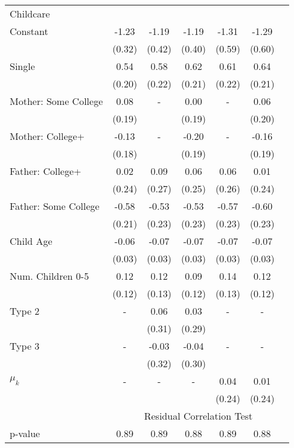 \begin{tabular}{lcccccc}
Childcare}\\\cmidrule(r){2-7}Constant&-1.23&-1.19&-1.19&-1.31&-1.29&\\&(0.32)&(0.42)&(0.40)&(0.59)&(0.60)&\\Single&0.54&0.58&0.62&0.61&0.64&\\&(0.20)&(0.22)&(0.21)&(0.22)&(0.21)&\\Mother: Some College&0.08&-&0.00&-&0.06&\\&(0.19)&&(0.19)&&(0.20)&\\Mother: College+&-0.13&-&-0.20&-&-0.16&\\&(0.18)&&(0.19)&&(0.19)&\\Father: College+&0.02&0.09&0.06&0.06&0.01&\\&(0.24)&(0.27)&(0.25)&(0.26)&(0.24)&\\Father: Some College&-0.58&-0.53&-0.53&-0.57&-0.60&\\&(0.21)&(0.23)&(0.23)&(0.23)&(0.23)&\\Child Age&-0.06&-0.07&-0.07&-0.07&-0.07&\\&(0.03)&(0.03)&(0.03)&(0.03)&(0.03)&\\Num. Children 0-5&0.12&0.12&0.09&0.14&0.12&\\&(0.12)&(0.13)&(0.12)&(0.13)&(0.12)&\\Type 2&-&0.06&0.03&-&-&\\&&(0.31)&(0.29)&&&\\Type 3&-&-0.03&-0.04&-&-&\\&&(0.32)&(0.30)&&&\\$\mu_{k}$&-&-&-&0.04&0.01&\\&&&&(0.24)&(0.24)&\\& \multicolumn{6}{c}{Residual Correlation Test}\\\cmidrule(r){2-7}p-value&0.89&0.89&0.88&0.89&0.88&\\
\bottomrule\end{tabular}
